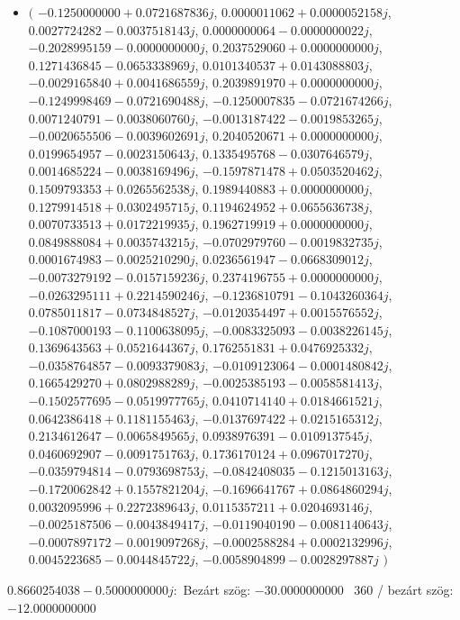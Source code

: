 \documentclass[14pt,a4paper]{article}
\begin{document}
\begin{itemize}
\item
$\big($
$-0.1250000000+0.0721687836j$, $0.0000011062+0.0000052158j$, $0.0027724282-0.0037518143j$, $0.0000000064-0.0000000022j$, $-0.2028995159-0.0000000000j$, $0.2037529060+0.0000000000j$, $0.1271436845-0.0653338969j$, $0.0101340537+0.0143088803j$, $-0.0029165840+0.0041686559j$, $0.2039891970+0.0000000000j$, $-0.1249998469-0.0721690488j$, $-0.1250007835-0.0721674266j$, $0.0071240791-0.0038060760j$, $-0.0013187422-0.0019853265j$, $-0.0020655506-0.0039602691j$, $0.2040520671+0.0000000000j$, $0.0199654957-0.0023150643j$, $0.1335495768-0.0307646579j$, $0.0014685224-0.0038169496j$, $-0.1597871478+0.0503520462j$, $0.1509793353+0.0265562538j$, $0.1989440883+0.0000000000j$, $0.1279914518+0.0302495715j$, $0.1194624952+0.0655636738j$, $0.0070733513+0.0172219935j$, $0.1962719919+0.0000000000j$, $0.0849888084+0.0035743215j$, $-0.0702979760-0.0019832735j$, $0.0001674983-0.0025210290j$, $0.0236561947-0.0668309012j$, $-0.0073279192-0.0157159236j$, $0.2374196755+0.0000000000j$, $-0.0263295111+0.2214590246j$, $-0.1236810791-0.1043260364j$, $0.0785011817-0.0734848527j$, $-0.0120354497+0.0015576552j$, $-0.1087000193-0.1100638095j$, $-0.0083325093-0.0038226145j$, $0.1369643563+0.0521644367j$, $0.1762551831+0.0476925332j$, $-0.0358764857-0.0093379083j$, $-0.0109123064-0.0001480842j$, $0.1665429270+0.0802988289j$, $-0.0025385193-0.0058581413j$, $-0.1502577695-0.0519977765j$, $0.0410714140+0.0184661521j$, $0.0642386418+0.1181155463j$, $-0.0137697422+0.0215165312j$, $0.2134612647-0.0065849565j$, $0.0938976391-0.0109137545j$, $0.0460692907-0.0091751763j$, $0.1736170124+0.0967017270j$, $-0.0359794814-0.0793698753j$, $-0.0842408035-0.1215013163j$, $-0.1720062842+0.1557821204j$, $-0.1696641767+0.0864860294j$, $0.0032095996+0.2272389643j$, $0.0115357211+0.0204693146j$, $-0.0025187506-0.0043849417j$, $-0.0119040190-0.0081140643j$, $-0.0007897172-0.0019097268j$, $-0.0002588284+0.0002132996j$, $0.0045223685-0.0044845722j$, $-0.0058904899-0.0028297887j$
$\big)$
\end{itemize}
$0.8660254038-0.5000000000j$:\
Bezárt szög: $-30.0000000000$ \
360 / bezárt szög: $-12.0000000000$\
\end{document}
